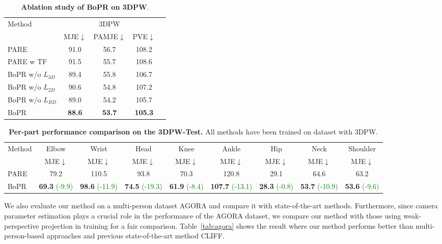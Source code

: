 \documentclass[10pt,twocolumn,letterpaper]{article}
\begin{document}
\begin{table}
\centering
\begin{tabular}{lcccc}
\toprule[1.5pt]
\multirow{2}{*}{Method} & \multicolumn{3}{c}{3DPW}  \\ 
 & MJE$\downarrow$ & PAMJE$\downarrow$ & PVE$\downarrow$  \\ \hline
PARE &91.0 &56.7 &108.2 \\ 
PARE w TF &91.5 &55.7 &108.6\\ \hline
BoPR w/o $L_{3D}$ &89.4 &55.8 &106.7\\
BoPR w/o $L_{2D}$ &90.6 &54.8 &107.2\\
BoPR w/o $L_{RD}$ &89.0 &54.2 &105.7\\
BoPR &\textbf{88.6} &\textbf{53.7} &\textbf{105.3}\\
\bottomrule[1.5pt]
\end{tabular}

\caption{\textbf{Ablation study of BoPR on 3DPW}.}
\label{tab:abl}
\end{table}

\begin{table*}
\centering
\begin{tabular}{lcccccccc}
\toprule[1.5pt]
\multirow{2}{*}{Method} & \multicolumn{1}{c}{Elbow} & \multicolumn{1}{c}{Wrist} & \multicolumn{1}{c}{Head}  & \multicolumn{1}{c}{Knee} & \multicolumn{1}{c}{Ankle} & \multicolumn{1}{c}{Hip} & \multicolumn{1}{c}{Neck} & \multicolumn{1}{c}{Shoulder}\\ 
 & MJE$\downarrow$ & MJE$\downarrow$ & MJE$\downarrow$ & MJE$\downarrow$  & MJE$\downarrow$  & MJE$\downarrow$  & MJE$\downarrow$  & MJE$\downarrow$\\ \hline
PARE &79.2 &110.5 &93.8 &70.3 &120.8 &29.1 &64.6 &63.2 
\\ \hline
BoPR &\textbf{69.3} \textcolor{green}{(-9.9)} &\textbf{98.6} \textcolor{green}{(-11.9)} &\textbf{74.5} \textcolor{green}{(-19.3)} &\textbf{61.9} \textcolor{green}{(-8.4)} &\textbf{107.7} \textcolor{green}{(-13.1)} &\textbf{28.3} \textcolor{green}{(-0.8)} &\textbf{53.7} \textcolor{green}{(-10.9)}&\textbf{53.6} \textcolor{green}{(-9.6)}\\\bottomrule[1.5pt]
\end{tabular}
\caption{\textbf{Per-part performance comparison on the 3DPW-Test.} All methods have been trained on dataset with 3DPW.}
\label{tab:perpart}
\end{table*}



We also evaluate our method on a multi-person dataset AGORA and compare it with state-of-the-art methods. Furthermore, since camera parameter estimation plays a crucial role in the performance of the AGORA dataset,  we compare our method with those using weak-perspective projection in training for a fair comparison. Table~\ref{tab:agora} shows the result where our method performs better than multi-person-based approaches and previous state-of-the-art method CLIFF.
\end{document}
